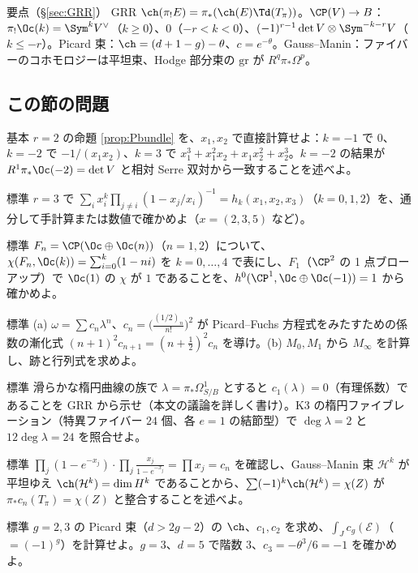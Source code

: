 \begin{keybox}{要点（\S\ref{sec:GRR}）}
GRR $\ch(\pi_!E)=\pi_*(\ch(E)\Td(T_\pi))$。$\CP(V)\to B$：$\pi_!\Oc(k)=\Sym^kV^\vee$（$k\ge0$）、$0$（$-r<k<0$）、$(-1)^{r-1}\det V\otimes\Sym^{-k-r}V$（$k\le-r$）。Picard 束：$\ch=(d+1-g)-\theta$、$c=e^{-\theta}$。Gauss--Manin：ファイバーのコホモロジーは平坦束、Hodge 部分束の $\mathrm{gr}$ が $R^q\pi_*\Omega^p$。
\end{keybox}

\subsection*{この節の問題}
\begin{prob}{基本}\label{p:Pbundle1}
$r=2$ の命題 \ref{prop:Pbundle} を、$x_1,x_2$ で直接計算せよ：$k=-1$ で $0$、$k=-2$ で $-1/(x_1x_2)$、$k=3$ で $x_1^3+x_1^2x_2+x_1x_2^2+x_2^3$。$k=-2$ の結果が $R^1\pi_*\Oc(-2)=\det V$ と相対 Serre 双対から一致することを述べよ。
\end{prob}
\begin{prob}{標準}\label{p:Lagrange}
$r=3$ で $\sum_ix_i^k\prod_{j\ne i}(1-x_j/x_i)^{-1}=h_k(x_1,x_2,x_3)$（$k=0,1,2$）を、通分して手計算または数値で確かめよ（$x=(2,3,5)$ など）。
\end{prob}
\begin{prob}{標準}\label{p:Hirz}
$F_n=\CP(\Oc\oplus\Oc(n))$（$n=1,2$）について、$\chi(F_n,\Oc(k))=\sum_{i=0}^k(1-ni)$ を $k=0,\dots,4$ で表にし、$F_1$（$\CP^2$ の 1 点ブローアップ）で $\Oc(1)$ の $\chi$ が $1$ であることを、$h^0(\CP^1,\Oc\oplus\Oc(-1))=1$ から確かめよ。
\end{prob}
\begin{prob}{標準}\label{p:Legendre}
(a) $\omega=\sum c_n\lambda^n$、$c_n=\bigl(\frac{(1/2)_n}{n!}\bigr)^2$ が Picard--Fuchs 方程式をみたすための係数の漸化式 $(n+1)^2c_{n+1}=(n+\frac12)^2c_n$ を導け。(b) $M_0,M_1$ から $M_\infty$ を計算し、跡と行列式を求めよ。
\end{prob}
\begin{prob}{標準}\label{p:Hodgedeg}
滑らかな楕円曲線の族で $\lambda=\pi_*\Omega^1_{S/B}$ とすると $c_1(\lambda)=0$（有理係数）であることを GRR から示せ（本文の議論を詳しく書け）。K3 の楕円ファイブレーション（特異ファイバー $24$ 個、各 $e=1$ の結節型）で $\deg\lambda=2$ と $12\deg\lambda=24$ を照合せよ。
\end{prob}
\begin{prob}{標準}\label{p:derhamGRR}
$\prod_j(1-e^{-x_j})\cdot\prod_j\frac{x_j}{1-e^{-x_j}}=\prod x_j=c_n$ を確認し、Gauss--Manin 束 $\mathcal H^k$ が平坦ゆえ $\ch(\mathcal H^k)=\dim H^k$ であることから、$\sum(-1)^k\ch(\mathcal H^k)=\chi(Z)$ が $\pi_*c_n(T_\pi)=\chi(Z)$ と整合することを述べよ。
\end{prob}
\begin{prob}{標準}\label{p:Picardg}
$g=2,3$ の Picard 束（$d>2g-2$）の $\ch$、$c_1,c_2$ を求め、$\int_J c_g(\mathcal E)$（$=(-1)^g$）を計算せよ。$g=3$、$d=5$ で階数 $3$、$c_3=-\theta^3/6=-1$ を確かめよ。
\end{prob}

